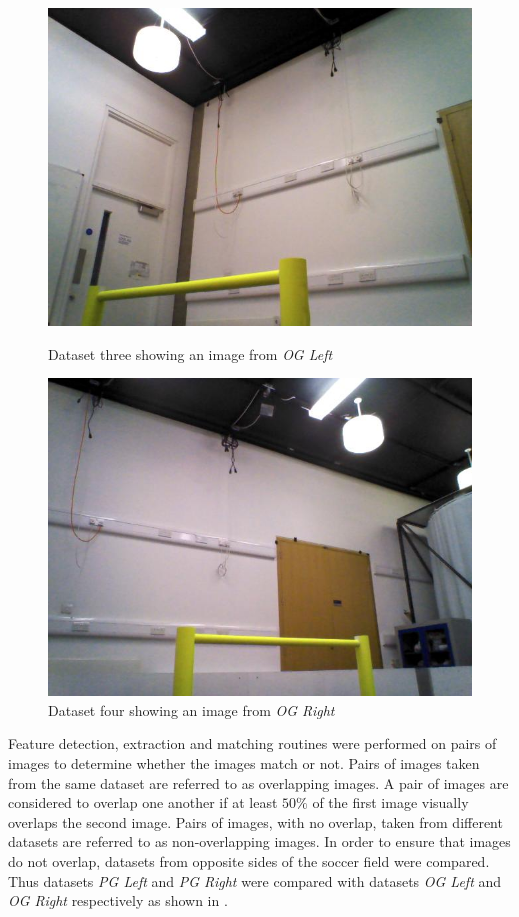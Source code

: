 \documentclass{article}
\begin{document}
\begin{figure}[h!]
\begin{minipage}[b]{0.5\linewidth}
\includegraphics[scale=0.5]{../Drawings/datasetImages/ogLeft.jpg}
\caption{Dataset three showing an image from \textit{OG Left}}
\label{fig:dataset3}
\end{minipage}
\hspace{0.5cm}
\begin{minipage}[b]{0.5\linewidth}
\includegraphics[scale=0.5]{../Drawings/datasetImages/ogRight.jpg}
\caption{Dataset four showing an image from \textit{OG Right}}
\label{fig:dataset4}
\end{minipage}
\end{figure}

Feature detection, extraction and matching routines were performed on pairs of images to determine whether the images match or not. Pairs of images taken from the same dataset are referred to as overlapping images. A pair of images are considered to overlap one another if at least $50\%$ of the first image visually overlaps the second image. Pairs of images, with no overlap, taken from different datasets are referred to as non-overlapping images. In order to ensure that images do not overlap, datasets from opposite sides of the soccer field were compared. Thus datasets \textit{PG Left} and \textit{PG Right} were compared with datasets \textit{OG Left} and \textit{OG Right} respectively as shown in . \\
\end{document}
